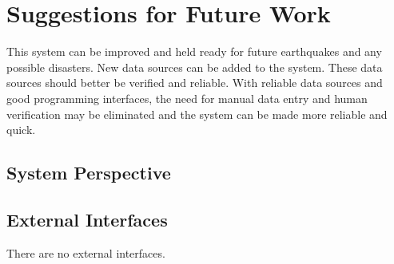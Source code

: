 \documentclass[a4paper]{article}
\begin{document}
    \section{Suggestions for Future Work}


    This system can be improved and held ready for future earthquakes and any possible disasters.
    New data sources can be added to the system. These data sources should better be verified and reliable. With reliable data sources and good programming interfaces, the need for manual data entry and human verification may be eliminated and
    the system can be made more reliable and quick.
    
        \subsection{System Perspective}
    

        \subsection{External Interfaces}
        There are no external interfaces.
        
\end{document}
